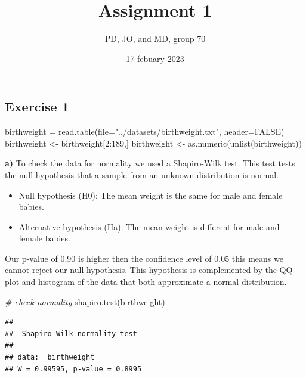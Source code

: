 \documentclass[
]{article}
\title{Assignment 1}
\author{PD, JO, and MD, group 70}
\date{17 febuary 2023}
\newenvironment{Shaded}{\begin{snugshade}}{\end{snugshade}}
\newcommand{\AttributeTok}[1]{\textcolor[rgb]{0.77,0.63,0.00}{#1}}
\newcommand{\CommentTok}[1]{\textcolor[rgb]{0.56,0.35,0.01}{\textit{#1}}}
\newcommand{\ConstantTok}[1]{\textcolor[rgb]{0.00,0.00,0.00}{#1}}
\newcommand{\DecValTok}[1]{\textcolor[rgb]{0.00,0.00,0.81}{#1}}
\newcommand{\FunctionTok}[1]{\textcolor[rgb]{0.00,0.00,0.00}{#1}}
\newcommand{\NormalTok}[1]{#1}
\newcommand{\OtherTok}[1]{\textcolor[rgb]{0.56,0.35,0.01}{#1}}
\newcommand{\SpecialCharTok}[1]{\textcolor[rgb]{0.00,0.00,0.00}{#1}}
\newcommand{\StringTok}[1]{\textcolor[rgb]{0.31,0.60,0.02}{#1}}
\begin{document}
\maketitle

\hypertarget{exercise-1}{%
\subsection{Exercise 1}\label{exercise-1}}

\begin{Shaded}
\begin{Highlighting}[]
\NormalTok{birthweight }\OtherTok{=} \FunctionTok{read.table}\NormalTok{(}\AttributeTok{file=}\StringTok{"../datasets/birthweight.txt"}\NormalTok{, }\AttributeTok{header=}\ConstantTok{FALSE}\NormalTok{)}
\NormalTok{birthweight }\OtherTok{\textless{}{-}}\NormalTok{ birthweight[}\DecValTok{2}\SpecialCharTok{:}\DecValTok{189}\NormalTok{,]}
\NormalTok{birthweight }\OtherTok{\textless{}{-}} \FunctionTok{as.numeric}\NormalTok{(}\FunctionTok{unlist}\NormalTok{(birthweight))}
\end{Highlighting}
\end{Shaded}

\textbf{a)} To check the data for normality we used a Shapiro-Wilk test.
This test tests the null hypothesis that a sample from an unknown
distribution is normal.

\begin{itemize}
\item
  Null hypothesis (H0): The mean weight is the same for male and female
  babies.
\item
  Alternative hypothesis (Ha): The mean weight is different for male and
  female babies.
\end{itemize}

Our p-value of 0.90 is higher then the confidence level of 0.05 this
means we cannot reject our null hypothesis. This hypothesis is
complemented by the QQ-plot and histogram of the data that both
approximate a normal distribution.

\begin{Shaded}
\begin{Highlighting}[]
\CommentTok{\# check normality}
\FunctionTok{shapiro.test}\NormalTok{(birthweight)}
\end{Highlighting}
\end{Shaded}

\begin{verbatim}
## 
##  Shapiro-Wilk normality test
## 
## data:  birthweight
## W = 0.99595, p-value = 0.8995
\end{verbatim}
\end{document}
